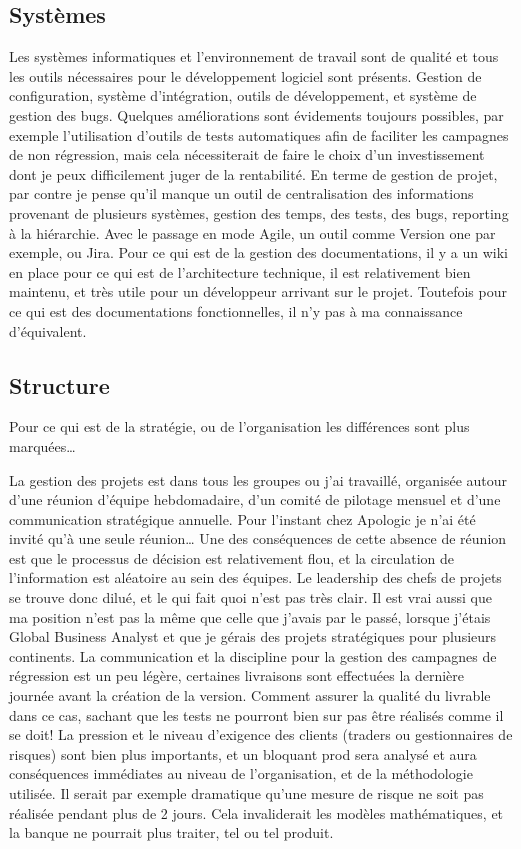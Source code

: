 \documentclass[11pt]{article} %
\begin{document}
\subsection{Systèmes}
Les systèmes informatiques et l’environnement de travail sont de qualité et tous les outils nécessaires pour le développement logiciel sont présents. Gestion de configuration, système d’intégration, outils de développement, et système de gestion des bugs. 
Quelques améliorations sont évidements toujours possibles, par exemple l’utilisation d’outils de tests automatiques afin de faciliter les campagnes de non régression, mais cela nécessiterait de faire le choix d’un investissement dont je peux difficilement juger de la rentabilité.
En terme de gestion de projet, par contre je pense qu’il manque un outil de centralisation des informations provenant de plusieurs systèmes, gestion des temps, des tests, des bugs, reporting à la hiérarchie. Avec le passage en mode Agile, un outil comme Version one par exemple, ou Jira.
Pour ce qui est de la gestion des documentations, il y a un wiki en place pour ce qui est de l’architecture technique, il est relativement bien maintenu, et très utile pour un développeur arrivant sur le projet.
Toutefois pour ce qui est des documentations fonctionnelles, il n’y pas à ma connaissance d’équivalent.

\subsection{Structure}
Pour ce qui est de la stratégie, ou de l’organisation les différences sont plus marquées…

La gestion des projets est dans tous les groupes ou j’ai travaillé, organisée autour d’une réunion d’équipe hebdomadaire, d’un comité de pilotage mensuel et d’une communication stratégique annuelle. Pour l’instant chez Apologic je n’ai été invité qu’à une seule réunion… Une des conséquences de cette absence de réunion est que le processus de décision est relativement flou, et la circulation de l’information est aléatoire au sein des équipes. Le leadership des chefs de projets se trouve donc dilué, et le qui fait quoi n’est pas très clair.
Il est vrai aussi que ma position n’est pas la même que celle que j’avais par le passé, lorsque j’étais Global Business Analyst et que je gérais des projets stratégiques pour plusieurs continents.
La communication et la discipline pour la gestion des campagnes de régression est un peu légère, certaines livraisons sont effectuées la dernière journée avant la création de la version. Comment assurer la qualité du livrable dans ce cas, sachant que les tests ne pourront bien sur pas être réalisés comme il se doit!
La pression et le niveau d’exigence des clients (traders ou gestionnaires de risques) sont bien plus importants, et un bloquant prod sera analysé et aura conséquences immédiates au niveau de l’organisation, et de la méthodologie utilisée.
Il serait par exemple dramatique qu’une mesure de risque ne soit pas réalisée pendant plus de 2 jours. Cela invaliderait les modèles mathématiques, et la banque ne pourrait plus traiter, tel ou tel produit.
\end{document}
